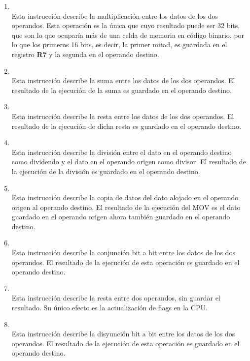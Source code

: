 \begin{enumerate}
\item  {}\\
Esta instrucción describe la multiplicación entre los datos de los dos operandos. Esta operación es la única que cuyo resultado puede ser 32 bits, que son lo que ocuparía más de una celda de memoria en código binario, por lo que los primeros 16 bits, es decir, la primer mitad, es guardada en el registro \textbf{R7} y la segunda en el operando destino.
 
\item  {}\\
Esta instrucción describe la suma entre los datos de los dos operandos. El resultado de la ejecución de la suma es guardado en el operando destino.

\item  {}\\
Esta instrucción describe la resta entre los datos de los dos operandos. El resultado de la ejecución de dicha resta es guardado en el operando destino.

\item  {}\\
Esta instrucción describe la división entre el dato en el operando destino como dividendo y el dato en el operando origen como divisor. El resultado de la ejecución de la división es guardado en el operando destino.

\item  {}\\
Esta instrucción describe la copia de datos del dato alojado en el operando origen al operando destino. El resultado de la ejecución del MOV es el dato guardado en el operando origen ahora también guardado en el operando destino.

\item  {}\\
Esta instrucción describe la conjunción bit a bit entre los datos de los dos operandos. El resultado de la ejecución de esta operación es guardado en el operando destino.

\item  {}\\
Esta instrucción describe la resta entre dos operandos, sin guardar el resultado. Su único efecto es la actualización de flags en la CPU.

\item  {}\\
Esta instrucción describe la disyunción bit a bit entre los datos de los dos operandos. El resultado de la ejecución de esta operación es guardado en el operando destino.
\end{enumerate}

